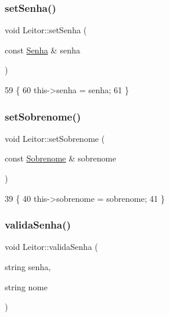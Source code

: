 \subsubsection{\texorpdfstring{set\+Senha()}{setSenha()}}
{\footnotesize\ttfamily void Leitor\+::set\+Senha (\begin{DoxyParamCaption}\item[{const \mbox{\hyperlink{class_senha}{Senha}} \&}]{senha }\end{DoxyParamCaption})\hspace{0.3cm}{\ttfamily [inline]}}


\begin{DoxyCode}
59 \{
60   this->senha = senha;
61 \}
\end{DoxyCode}
\mbox{\label{class_leitor_affdb7e753343758607242d67dcda033b}} 
\subsubsection{\texorpdfstring{set\+Sobrenome()}{setSobrenome()}}
{\footnotesize\ttfamily void Leitor\+::set\+Sobrenome (\begin{DoxyParamCaption}\item[{const \mbox{\hyperlink{class_sobrenome}{Sobrenome}} \&}]{sobrenome }\end{DoxyParamCaption})\hspace{0.3cm}{\ttfamily [inline]}}


\begin{DoxyCode}
39     \{
40       this->sobrenome = sobrenome;
41     \}
\end{DoxyCode}
\mbox{\label{class_leitor_ab3d322a25d04ea7c6b8daf0d1bf0d85f}} 
\subsubsection{\texorpdfstring{valida\+Senha()}{validaSenha()}}
{\footnotesize\ttfamily void Leitor\+::valida\+Senha (\begin{DoxyParamCaption}\item[{string}]{senha,  }\item[{string}]{nome }\end{DoxyParamCaption})\hspace{0.3cm}{\ttfamily [inline]}}


